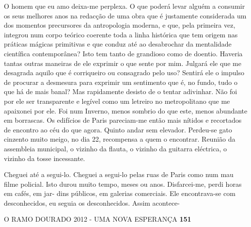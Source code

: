 O homem que eu amo deixa-me perplexa. O que poderá levar alguém a
consumir os seus melhores anos na redacção de uma obra que é justamente
considerada um dos momentos precursores da antropologia moderna, e que,
pela primeira vez, integrou num corpo teórico coerente toda a linha
histórica que tem origem nas práticas mágicas primitivas e que conduz
até ao desabrochar da mentalidade científica contemporânea? Isto tem
tanto de grandioso como de doentio. Haveria tantas outras maneiras de
ele exprimir o que sente por mim. Julgará ele que me desagrada aquilo
que é corriqueiro ou consagrado pelo uso? Sentirá ele o impulso de
procurar a desmesura para exprimir um sentimento que é, no fundo, tudo o
que há de mais banal? Mas rapidamente desisto de o tentar adivinhar. Não
foi por ele ser transparente e legível como um letreiro no metropolitano
que me apaixonei por ele. Foi num Inverno, menos sombrio do que este,
menos abundante em borrascas. Os edifícios de Paris pareciam-me então
mais nítidos e recortados de encontro ao céu do que agora. Quinto andar
sem elevador. Perdeu-se gato cinzento muito meigo, no dia 22, recompensa
a quem o encontrar. Reunião da assembleia municipal, o vizinho da
flauta, o vizinho da guitarra eléctrica, o vizinho da tosse incessante.

Cheguei até a segui-lo. Cheguei a segui-lo pelas ruas de Paris como num
mau filme policial. Isto durou muito tempo, meses ou anos. Disfarcei-me,
perdi horas em cafés, em jar- dins públicos, em galerias comerciais. Ele
encontrava-se com desconhecidos, eu seguia os desconhecidos. Assim
acontece-

O RAMO DOURADO 2012 - UMA NOVA ESPERANÇA \textbf{151}

